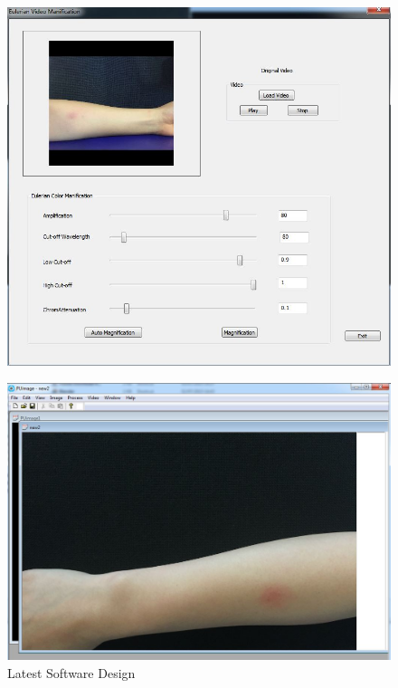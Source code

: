 \begin{figure}[!ht]
	\centering
	\includegraphics[scale=0.6]{img/eulerian}
\end{figure}

\begin{figure}[!ht]
	\centering
	\includegraphics[scale=0.6]{img/nowProject}
	\caption{Latest Software Design}
\end{figure}